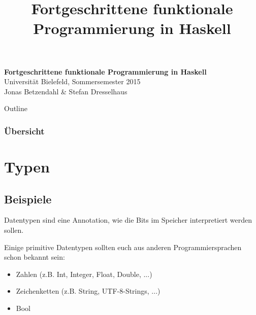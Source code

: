 \documentclass{beamer}
\title{Fortgeschrittene funktionale Programmierung in Haskell}
\begin{document}
  

  \begin{frame}
  \begin{center}
    \huge\textbf{Fortgeschrittene funktionale Programmierung in Haskell}\\ \bigskip
    \LARGE Universität Bielefeld, Sommersemester 2015\\ \bigskip
    \large Jonas Betzendahl \& Stefan Dresselhaus
    \end{center}
  \end{frame}

\begin{frame}[allowframebreaks]{Outline}
\frametitle{Übersicht}
\tableofcontents[hideallsubsections]
\end{frame}

\section{Typen}
\subsection{Beispiele}
\begin{frame}
 Datentypen sind eine Annotation, wie die Bits im Speicher interpretiert werden sollen. \bigskip
 
 \pause
 
 Einige primitive Datentypen sollten euch aus anderen Programmiersprachen schon bekannt sein:
 
 \begin{itemize}
  \item Zahlen (z.B. Int, Integer, Float, Double, ...)
  \item Zeichenketten (z.B. String, UTF-8-Strings, ...)
  \item Bool
 \end{itemize}
\end{frame}
\end{document}
